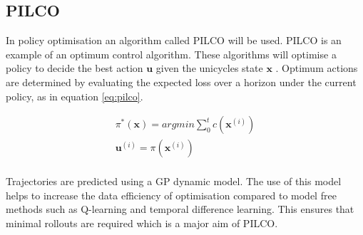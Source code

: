 \documentclass[twoside,twocolumn,12pt]{article}
\begin{document}
\subsection{PILCO}
In policy optimisation an algorithm called PILCO \cite{pilco} will be used.
PILCO is an example of an optimum control algorithm. These algorithms will optimise a policy to decide the best action $\textbf{u}$ given the unicycles state $\textbf{x}$ .
Optimum actions are determined by evaluating the expected loss over a horizon under the current policy, as in equation \ref{eq:pilco}. 

\begin{equation}
\begin{split}
\pi^*(\textbf{x}) = argmin \sum_0^tc(\textbf{x}^{(i)}) \\
\textbf{u}^{(i)} = \pi(\textbf{x}^{(i)} )\\
\end{split}
\label{eq:pilco}
\end{equation}

Trajectories are predicted using a GP dynamic model. The use of this model helps to increase the data efficiency of optimisation compared to model free methods such as Q-learning and temporal difference learning. This ensures that minimal rollouts are required which is a major aim of PILCO.
\end{document}
